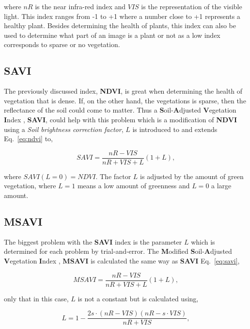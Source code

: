 where $nR$ is the near infra-red index and $VIS$ is the representation of the visible light. This index ranges from -1 to +1 where a number close to +1 represents a healthy plant. Besides determining the health of plants, this index can also be used to determine what part of an image is a plant or not as a low index corresponds to sparse or no vegetation.

\subsection{SAVI}

The previously discussed index, \textbf{NDVI}, is great when determining the health of vegetation that is dense. If, on the other hand, the vegetations is sparse, then the reflectance of the soil could come to matter. Thus a \textbf{S}oil-\textbf{A}djusted \textbf{V}egetation \textbf{I}ndex \cite{saviSource}, \textbf{SAVI}, could help with this problem which is a modification of \textbf{NDVI} using a \textit{Soil brightness correction factor}, $L$ is introduced to and extends Eq.~\eqref{eq:ndvi} to,

\begin{equation}
	\label{eq:savi}
	SAVI=\frac{nR-VIS}{nR+VIS+L}(1+L),
\end{equation}

where $SAVI(L=0)=NDVI$. The factor $L$ is adjusted by the amount of green vegetation, where $L=1$ means a low amount of greenness and $L=0$ a large amount.

\subsection{MSAVI}

The biggest problem with the \textbf{SAVI} index is the parameter $L$ which is determined for each problem by trial-and-error. The \textbf{M}odified \textbf{S}oil-\textbf{A}djusted \textbf{V}egetation \textbf{I}ndex \cite{msaviSource}, \textbf{MSAVI} is calculated the same way as \textbf{SAVI} Eq.~\eqref{eq:savi},

\begin{equation}
    MSAVI = \frac{nR-VIS}{nR+VIS+L}(1+L),
\end{equation}

only that in this case, $L$ is not a constant but is calculated using,

\begin{equation}
	L = 1-\frac{2s\cdot(nR-VIS)(nR-s\cdot VIS)}{nR + VIS},
\end{equation}

